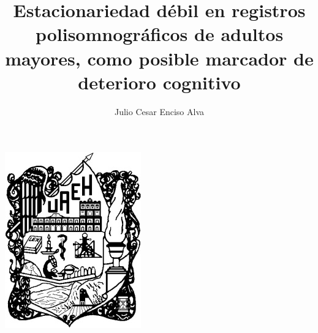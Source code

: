 \documentclass[12pt,a4paper]{mitthesis}
\begin{document}
\setcounter{page}{0}
\thispagestyle{empty}

\title{Estacionariedad d\'ebil en registros polisomnogr\'aficos de adultos mayores,
como posible marcador de deterioro cognitivo}
%
\author{Julio Cesar Enciso Alva}
%
%
%
{
\begin{center}
\includegraphics[width=0.2\linewidth]{./portada/logo_uaeh.png}\\
{\Large \textbf{ \textsc{
}}}
\end{center}}
\end{document}
